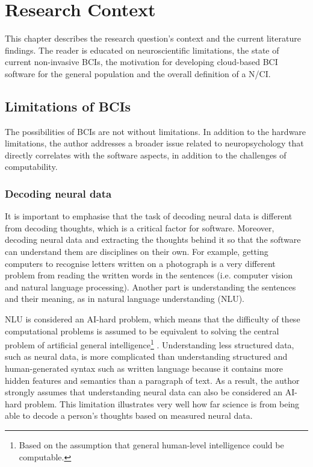 \chapter{Research Context}
\graphicspath{{Chapter2/Figs/}{Chapter2/Figs/}}

This chapter describes the research question's context and the current literature findings. The reader is educated on neuroscientific limitations, the state of current non-invasive BCIs, the motivation for developing cloud-based BCI software for the general population and the overall definition of a N/CI.

\section{Limitations of BCIs}
\label{chapter2-limitations-of-bcis}

The possibilities of BCIs are not without limitations. In addition to the hardware limitations, the author addresses a broader issue related to neuropsychology that directly correlates with the software aspects, in addition to the challenges of computability.

\subsection{Decoding neural data}
\label{chapter2-decoding-neural-data}

It is important to emphasise that the task of decoding neural data is different from decoding thoughts, which is a critical factor for software. Moreover, decoding neural data and extracting the thoughts behind it so that the software can understand them are disciplines on their own. For example, getting computers to recognise letters written on a photograph is a very different problem from reading the written words in the sentences (i.e. computer vision and natural language processing). Another part is understanding the sentences and their meaning, as in natural language understanding (NLU).

NLU is considered an AI-hard problem, which means that the difficulty of these computational problems is assumed to be equivalent to solving the central problem of artificial general intelligence\footnote{Based on the assumption that general human-level intelligence could be computable.} \citep{demasi_theoretical_2010}. Understanding less structured data, such as neural data, is more complicated than understanding structured and human-generated syntax such as written language because it contains more hidden features and semantics than a paragraph of text. As a result, the author strongly assumes that understanding neural data can also be considered an AI-hard problem. This limitation illustrates very well how far science is from being able to decode a person's thoughts based on measured neural data.

